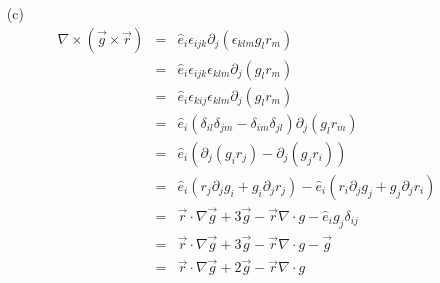 \documentclass{report}
\begin{document}
\begin{enumerate}
\begin{enumerate}
\item[(c)] 
\begin{eqnarray*}
\nabla\times(\vec{g}\times\vec{r}) &=& 
    \hat{e}_i\epsilon_{ijk}\partial_j(\epsilon_{klm}g_lr_m) \\
 &=& \hat{e}_i\epsilon_{ijk}\epsilon_{klm}\partial_j(g_lr_m) \\
 &=& \hat{e}_i\epsilon_{kij}\epsilon_{klm}\partial_j(g_lr_m) \\
 &=& \hat{e}_i(\delta_{il}\delta_{jm} - \delta_{im}\delta_{jl})
     \partial_j(g_lr_m) \\
 &=& \hat{e}_i(\partial_j(g_ir_j) - \partial_j(g_jr_i)) \\
 &=& \hat{e}_i(r_j\partial_j g_i + g_i\partial_jr_j) -
     \hat{e}_i(r_i\partial_jg_j + g_j\partial_jr_i) \\
 &=& \vec{r}\cdot\nabla\vec{g} + 3\vec{g} - \vec{r}\nabla\cdot{g} 
     - \hat{e}_ig_j\delta_{ij} \\
 &=& \vec{r}\cdot\nabla\vec{g} + 3\vec{g} - \vec{r}\nabla\cdot{g} - \vec{g} \\
 &=& \vec{r}\cdot\nabla\vec{g} + 2\vec{g} - \vec{r}\nabla\cdot{g}
\end{eqnarray*}

\end{enumerate}
\end{enumerate}
\end{document}
